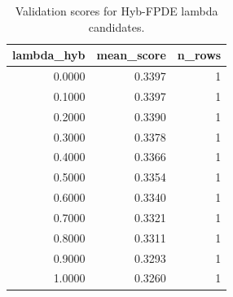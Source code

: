 \begin{table}[t]
\caption{Validation scores for Hyb-FPDE lambda candidates.}
\label{tab:lambda_distribution_computed}
\centering
\begin{tabular}{rrr}
\toprule
lambda\_hyb & mean\_score & n\_rows \\
\midrule
0.0000 & 0.3397 & 1 \\
0.1000 & 0.3397 & 1 \\
0.2000 & 0.3390 & 1 \\
0.3000 & 0.3378 & 1 \\
0.4000 & 0.3366 & 1 \\
0.5000 & 0.3354 & 1 \\
0.6000 & 0.3340 & 1 \\
0.7000 & 0.3321 & 1 \\
0.8000 & 0.3311 & 1 \\
0.9000 & 0.3293 & 1 \\
1.0000 & 0.3260 & 1 \\
\bottomrule
\end{tabular}

\end{table}
